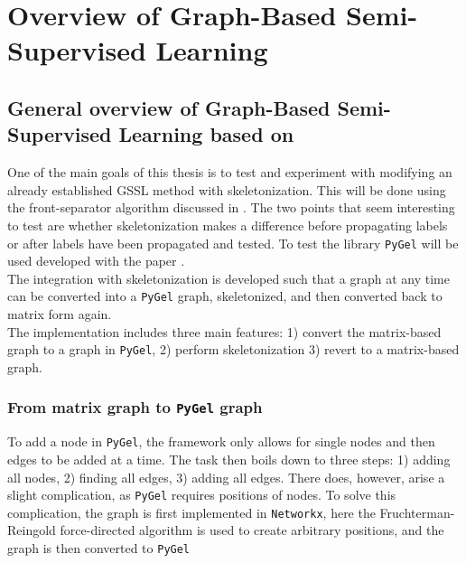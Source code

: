 \documentclass[10pt, letterpaper]{article}
\begin{document}
\section{Overview of Graph-Based Semi-Supervised Learning}
\subsection{General overview of Graph-Based Semi-Supervised Learning based on }


\newpage
\nocite{*}
\printbibliography[heading=bibintoc,title={Bibliography}]




One of the main goals of this thesis is to test and experiment with modifying an already established GSSL method with skeletonization. This will be done using the front-separator algorithm discussed in . The two points that seem interesting to test are whether skeletonization makes a difference before propagating labels or after labels have been propagated and tested. To test the library \texttt{PyGel} will be used developed with the paper \cite{DBLP:journals/corr/abs-2102-13303}. \\

The integration with skeletonization is developed such that a graph at any time can be converted into a \texttt{PyGel} graph, skeletonized, and then converted back to matrix form again. \\

The implementation includes three main features: 1) convert the matrix-based graph to a graph in \texttt{PyGel}, 2) perform skeletonization 3) revert to a matrix-based graph.

\subsubsection{From matrix graph to \texttt{PyGel} graph}
To add a node in \texttt{PyGel}, the framework only allows for single nodes and then edges to be added at a time. The task then boils down to three steps: 1) adding all nodes, 2) finding all edges, 3) adding all edges. There does, however, arise a slight complication, as \texttt{PyGel} requires positions of nodes. To solve this complication, the graph is first implemented in \texttt{Networkx}, here the Fruchterman-Reingold force-directed algorithm \cite{graphpositionalgo} is used to create arbitrary positions, and the graph is then converted to \texttt{PyGel}
\end{document}
